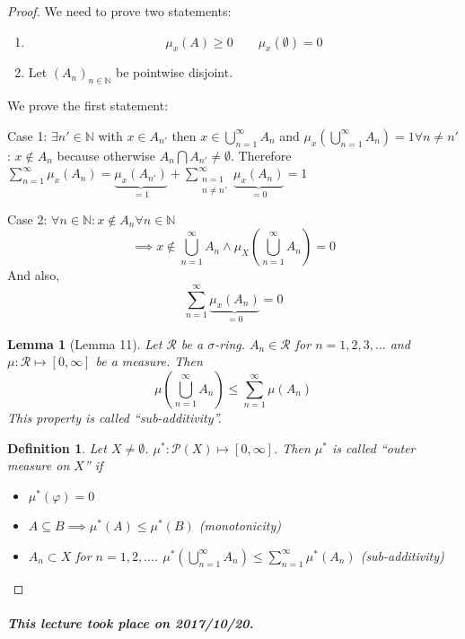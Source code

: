 \documentclass{article}
\newtheorem{definition}{Definition}  \numberwithin{definition}{section}
\newtheorem{lemma}{Lemma}  \numberwithin{lemma}{section}
\newcommand{\dateref}[1]{\paragraph{\textit{This lecture took place on #1.}}}
\begin{document}
\begin{proof}
  We need to prove two statements:
  \begin{enumerate}
    \item \[ \mu_x(A) \geq 0 \qquad \mu_x(\emptyset) = 0 \]
    \item Let $(A_n)_{n \in \mathbb N}$ be pointwise disjoint.
  \end{enumerate}

  We prove the first statement:

  Case 1: $\exists n' \in \mathbb N$ with $x \in A_{n'}$ then $x \in \bigcup_{n=1}^\infty A_n$ and $\mu_x(\bigcup_{n=1}^\infty A_n) = 1 \forall n \neq n'$:
  $x \not\in A_n$ because otherwise $A_n \bigcap A_{n'} \neq \emptyset$. Therefore
  $\sum_{n=1}^\infty \mu_x(A_n) = \underbrace{\mu_{x}\left(A_{n'}\right)}_{=1} + \sum_{\substack{n = 1 \\ n \neq n'}}^\infty \underbrace{\mu_x(A_n)}_{=0} = 1$
  
  Case 2: $\forall n \in \mathbb N: x \not\in A_n \forall n \in \mathbb N$
  \[ \implies x \not\in \bigcup_{n=1}^\infty A_n \land \mu_X(\bigcup_{n=1}^\infty A_n) = 0 \]
  And also,
  \[ \sum_{n=1}^\infty \underbrace{\mu_x(A_n)}_{=0} = 0 \]

  \begin{lemma}[Lemma 11]
    Let $\mathcal R$ be a $\sigma$-ring.
    $A_n \in \mathcal R$ for $n = 1, 2, 3, \ldots$ and $\mu: \mathcal R \mapsto [0,\infty]$ be a measure.
    Then
    \[ \mu\left(\bigcup_{n=1}^\infty A_n\right) \leq \sum_{n=1}^\infty \mu(A_n) \]
    This property is called \enquote{sub-additivity}.
  \end{lemma}

  \begin{definition}
    Let $X \neq \emptyset$. $\mu^*: \mathcal P(X) \mapsto [0, \infty]$.
    Then $\mu^*$ is called \enquote{outer measure on $X$} if
    \begin{itemize}
      \item $\mu^*(\varphi) = 0$
      \item $A \subseteq B \implies \mu^*(A) \leq \mu^*(B)$ (monotonicity)
      \item $A_n \subset X$ for $n = 1, 2, \ldots$. $\mu^*(\bigcup_{n=1}^\infty A_n) \leq \sum_{n=1}^\infty \mu^*(A_n)$ (sub-additivity)
    \end{itemize}
  \end{definition}
\end{proof}

\dateref{2017/10/20}
\end{document}
